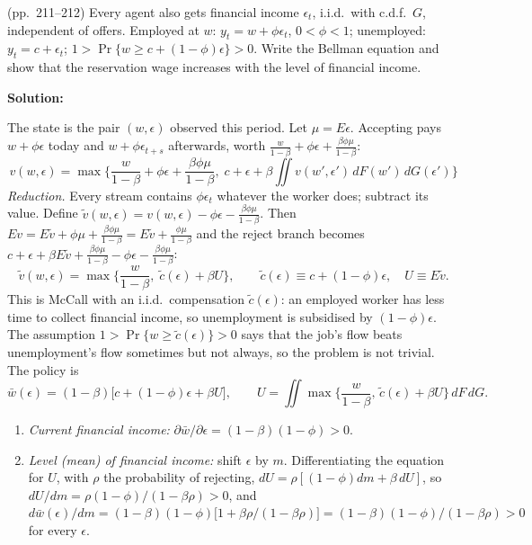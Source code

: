 \documentclass[12pt, letterpaper]{article}
\newcommand{\wb}{\bar w}
\begin{document}
\begin{tcolorbox}[evenbox,title={Exercise 6.12 \quad Search and Financial Income}]
\begin{tcolorbox}[questionbox]
(pp.~211--212) Every agent also gets financial income $\epsilon_t$, i.i.d.\ with c.d.f.\ $G$, independent of
offers. Employed at $w$: $y_t=w+\phi\epsilon_t$, $0<\phi<1$; unemployed: $y_t=c+\epsilon_t$;
$1>\Pr\{w\ge c+(1-\phi)\epsilon\}>0$. Write the Bellman equation and show that the reservation wage
increases with the level of financial income.
\end{tcolorbox}

\textbf{Solution:}

The state is the pair $(w,\epsilon)$ observed this period. Let $\mu=E\epsilon$. Accepting pays
$w+\phi\epsilon$ today and $w+\phi\epsilon_{t+s}$ afterwards, worth $\frac{w}{1-\beta}+\phi\epsilon+\frac{\beta\phi\mu}{1-\beta}$:
\[
\boxed{v(w,\epsilon)=\max\Big\{\frac{w}{1-\beta}+\phi\epsilon+\frac{\beta\phi\mu}{1-\beta},\;
c+\epsilon+\beta\iint v(w',\epsilon')\,dF(w')\,dG(\epsilon')\Big\}}
\]
\emph{Reduction.} Every stream contains $\phi\epsilon_t$ whatever the worker does; subtract its value.
Define $\tilde v(w,\epsilon)=v(w,\epsilon)-\phi\epsilon-\frac{\beta\phi\mu}{1-\beta}$. Then
$E v=E\tilde v+\phi\mu+\frac{\beta\phi\mu}{1-\beta}=E\tilde v+\frac{\phi\mu}{1-\beta}$ and the reject branch
becomes $c+\epsilon+\beta E\tilde v+\frac{\beta\phi\mu}{1-\beta}-\phi\epsilon-\frac{\beta\phi\mu}{1-\beta}$:
\[
\tilde v(w,\epsilon)=\max\Big\{\frac{w}{1-\beta},\;\tilde c(\epsilon)+\beta U\Big\},\qquad
\tilde c(\epsilon)\equiv c+(1-\phi)\epsilon,\quad U\equiv E\tilde v .
\]
This is McCall with an i.i.d.\ compensation $\tilde c(\epsilon)$: an employed worker has less time to
collect financial income, so unemployment is subsidised by $(1-\phi)\epsilon$. The assumption
$1>\Pr\{w\ge\tilde c(\epsilon)\}>0$ says that the job's flow beats unemployment's flow sometimes but not
always, so the problem is not trivial. The policy is
\[
\boxed{\wb(\epsilon)=(1-\beta)\big[c+(1-\phi)\epsilon+\beta U\big]},\qquad
U=\iint\max\Big\{\frac{w}{1-\beta},\,\tilde c(\epsilon)+\beta U\Big\}\,dF\,dG .
\]
\begin{enumerate}[label=(\roman*)]
\item \emph{Current financial income:} $\partial\wb/\partial\epsilon=(1-\beta)(1-\phi)>0$.
\item \emph{Level (mean) of financial income:} shift $\epsilon$ by $m$. Differentiating the equation for $U$,
with $\rho$ the probability of rejecting,
$dU=\rho[(1-\phi)dm+\beta\,dU]$, so $dU/dm=\rho(1-\phi)/(1-\beta\rho)>0$, and
$d\wb(\epsilon)/dm=(1-\beta)(1-\phi)\big[1+\beta\rho/(1-\beta\rho)\big]=(1-\beta)(1-\phi)/(1-\beta\rho)>0$ for every
$\epsilon$.
\end{enumerate}


\end{tcolorbox}
\end{document}
